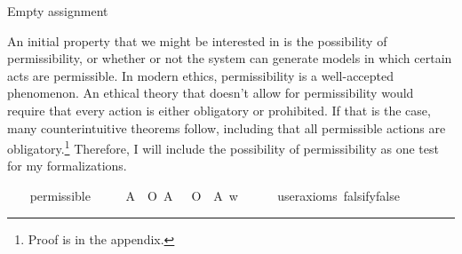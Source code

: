 \begin{isabellebody}
{  Empty assignment \color{black}%
}\isanewline
%
\isanewline
\isanewline
%
\endisatagproof
{\isafoldproof}%
%
\isadelimproof
%
\endisadelimproof
%
\isadelimproof
%
\endisadelimproof
%
\isatagproof
%
\endisatagproof
{\isafoldproof}%
%
\isadelimproof
%
\endisadelimproof
%
\isadelimproof
%
\endisadelimproof
%
\isatagproof
%
\endisatagproof
{\isafoldproof}%
%
\isadelimproof
%
\endisadelimproof
%
\isadelimproof
%
\endisadelimproof
%
\isatagproof
%
\endisatagproof
{\isafoldproof}%
%
\isadelimproof
%
\endisadelimproof
%
\isadelimproof
%
\endisadelimproof
%
\isatagproof
%
\endisatagproof
{\isafoldproof}%
%
\isadelimproof
%
\endisadelimproof
%
\begin{isamarkuptext}%
An initial property that we might be interested in is the possibility of permissibility, or 
whether or not the system can generate models in which certain acts are permissible. In modern ethics, 
permissibility is a well-accepted phenomenon.
An ethical theory that doesn't allow for permissibility would require that every action is either obligatory or 
prohibited. If that is the case, many counterintuitive theorems follow, including that all 
permissible actions are obligatory.\footnote{Proof is in the appendix.} Therefore, I will include 
the possibility of permissibility as one test for my formalizations.%
\end{isamarkuptext}\isamarkuptrue%
\ \ \isamarkupfalse%
\ permissible{\isacharcolon}\isanewline
\ \ \ \ \ {\isachardoublequoteopen}{\isasymexists}A{\isachardot}\ {\isacharparenleft}{\isacharparenleft}\isactrlbold {\isasymnot}\ {\isacharparenleft}O\ {\isacharbraceleft}A{\isacharbraceright}{\isacharparenright}{\isacharparenright}\ \isactrlbold {\isasymand}\ {\isacharparenleft}\isactrlbold {\isasymnot}\ {\isacharparenleft}O\ {\isacharbraceleft}\isactrlbold {\isasymnot}\ A{\isacharbraceright}{\isacharparenright}{\isacharparenright}{\isacharparenright}\ w{\isachardoublequoteclose}\isanewline
\ \ \ \ \isamarkupfalse%
\ {\isacharbrackleft}user{\isacharunderscore}axioms{\isacharcomma}\ falsify{\isacharequal}false{\isacharbrackright}%
\isadelimproof
\ %
\endisadelimproof
%
\isatagproof
{}\isamarkupfalse%
\isanewline
%
\end{isabellebody}
